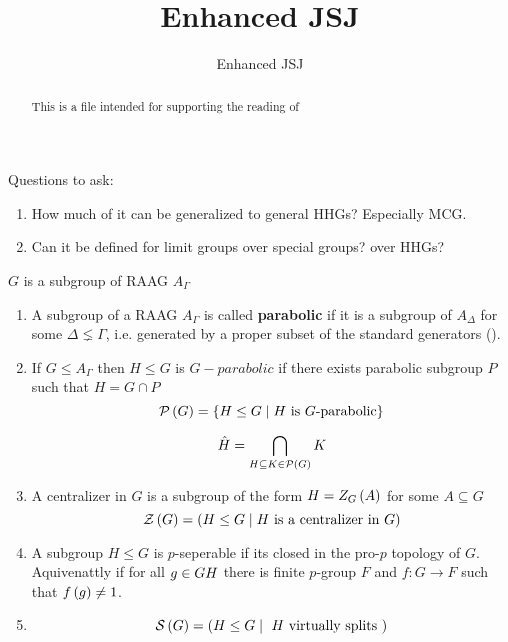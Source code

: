 \documentclass[11pt,a4paper]{article}
\title{Enhanced JSJ}
\author{Enhanced JSJ}
\date{}
\begin{document}
 
\maketitle
\begin{abstract}
    This is a file intended for supporting the reading of \cite{Fiv25}
\end{abstract}

Questions to ask:
\begin{enumerate}
    \item How much of it can be generalized to general HHGs? Especially MCG.
    \item Can it be defined for limit groups over special groups? over HHGs?
\end{enumerate}


$G$ is a subgroup of RAAG $A_\Gamma$


\begin{definition}
    \begin{enumerate}
        \item A subgroup of a RAAG $A_\Gamma$ is called \textbf{parabolic} if it is a subgroup of $A_\Delta$ for some $\Delta \lneq \Gamma$, i.e. generated by a proper subset of the standard generators ().
        \item If $G\leq A_\Gamma$ then $H\leq G$ is $G-parabolic$ if there exists parabolic subgroup $P$ such that $H=G\cap P$
        \begin{equation*}
            \mathcal{P} \left(  G  \right) = \left\{  H \leq G \mid \mbox{$H$ is $G$-parabolic}  \right\}
        \end{equation*}



        
        \begin{equation*}
            \hat{H} = \bigcap_{H \subseteq K\in \mathcal{P}\left(  G  \right)} K
        \end{equation*}
        \item A centralizer in $G$ is a subgroup of the form $H=Z_G\left(  A  \right)$ for some $A\subseteq G$
        \begin{equation*}
            \mathcal{Z} \left(  G  \right) = \left(  H \leq G \mid \mbox{$H$ is a centralizer in $G$}  \right)
        \end{equation*}
        \item A subgroup $H\leq G$ is $p$-seperable if its closed in the pro-$p$ topology of $G$. Aquivenattly if for all $g\in G\\H$ there is finite $p$-group $F$ and $f:G\to F$ such that $f\left(  g  \right)\neq 1 $.
        \item 
        \begin{equation*}
            \mathcal{S} \left(  G  \right) = \left(  H \leq G \mid \mbox{ $H$ virtually splits }  \right)
        \end{equation*}
    \end{enumerate}
\end{definition}



\printbibliography
\end{document}
